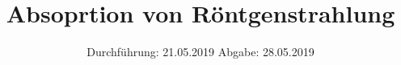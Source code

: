 

\subject{V602}
\title{Absoprtion von Röntgenstrahlung}
\date{
  Durchführung: 21.05.2019
  \hspace{3em}
  Abgabe: 28.05.2019
}


\maketitle
\thispagestyle{empty}
\tableofcontents
\newpage

%


%



\nocite{*}
\printbibliography

